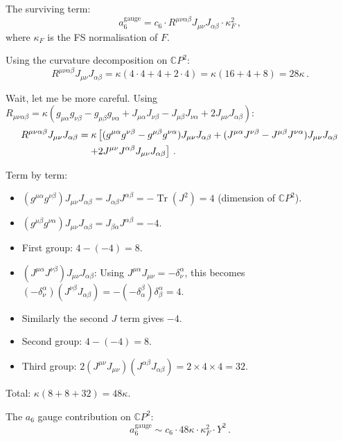 \documentclass[11pt,a4paper]{article}
\newcommand{\Tr}{\operatorname{Tr}}
\newcommand{\CP}{\mathbb{C}P}
\begin{document}
The surviving term:
\begin{equation}
a_6^{\mathrm{gauge}} = c_6 \cdot R^{\mu\nu\alpha\beta}J_{\mu\nu}J_{\alpha\beta} \cdot \kappa_F^2\,,
\end{equation}
where $\kappa_F$ is the FS normalisation of $F$.

Using the curvature decomposition on $\CP^2$:
\begin{equation}
R^{\mu\nu\alpha\beta}J_{\mu\nu}J_{\alpha\beta} = \kappa(4 \cdot 4 + 4 + 2 \cdot 4) = \kappa(16 + 4 + 8) = 28\kappa\,.
\end{equation}

Wait, let me be more careful. Using $R_{\mu\nu\alpha\beta} = \kappa(g_{\mu\alpha}g_{\nu\beta} - g_{\mu\beta}g_{\nu\alpha} + J_{\mu\alpha}J_{\nu\beta} - J_{\mu\beta}J_{\nu\alpha} + 2J_{\mu\nu}J_{\alpha\beta})$:
\begin{align}
R^{\mu\nu\alpha\beta}J_{\mu\nu}J_{\alpha\beta} &= \kappa\left[(g^{\mu\alpha}g^{\nu\beta} - g^{\mu\beta}g^{\nu\alpha})J_{\mu\nu}J_{\alpha\beta} + (J^{\mu\alpha}J^{\nu\beta} - J^{\mu\beta}J^{\nu\alpha})J_{\mu\nu}J_{\alpha\beta}\right. \notag\\
&\quad\left.+ 2J^{\mu\nu}J^{\alpha\beta}J_{\mu\nu}J_{\alpha\beta}\right]\,.
\end{align}

Term by term:
\begin{itemize}
\item $(g^{\mu\alpha}g^{\nu\beta})J_{\mu\nu}J_{\alpha\beta} = J_{\alpha\beta}J^{\alpha\beta} = -\Tr(J^2) = 4$ (dimension of $\CP^2$).
\item $(g^{\mu\beta}g^{\nu\alpha})J_{\mu\nu}J_{\alpha\beta} = J_{\beta\alpha}J^{\alpha\beta} = -4$.
\item First group: $4 - (-4) = 8$.
\item $(J^{\mu\alpha}J^{\nu\beta})J_{\mu\nu}J_{\alpha\beta}$: Using $J^{\mu\alpha}J_{\mu\nu} = -\delta^{\alpha}_\nu$, this becomes $(-\delta^\alpha_\nu)(J^{\nu\beta}J_{\alpha\beta}) = -(-\delta^\beta_\alpha)\delta^\alpha_\beta = 4$.
\item Similarly the second $J$ term gives $-4$.
\item Second group: $4 - (-4) = 8$.
\item Third group: $2(J^{\mu\nu}J_{\mu\nu})(J^{\alpha\beta}J_{\alpha\beta}) = 2 \times 4 \times 4 = 32$.
\end{itemize}

Total: $\kappa(8 + 8 + 32) = 48\kappa$.

The $a_6$ gauge contribution on $\CP^2$:
\begin{equation}
a_6^{\mathrm{gauge}} \sim c_6 \cdot 48\kappa \cdot \kappa_F^2 \cdot Y^2\,.
\end{equation}
\end{document}
